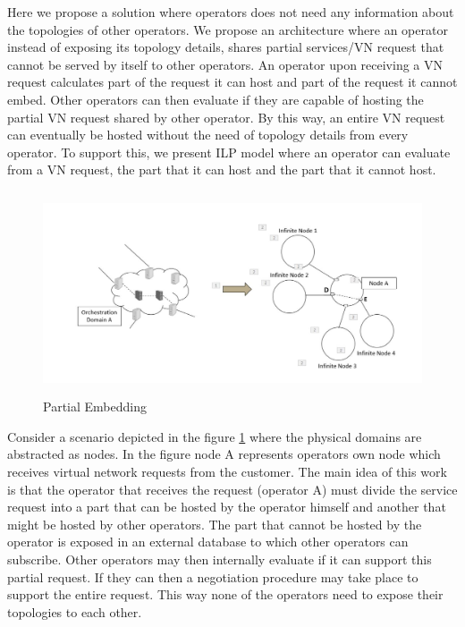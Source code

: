 \documentclass[article,dr=phil,type=msc ,colorback,accentcolor=tud4b]{tudthesis}
\begin{document}
Here we propose a solution where operators does not need any information about the topologies of other operators. We propose an architecture where an operator instead of exposing its topology details, shares partial services/VN request that cannot be served by itself to other operators. An operator upon receiving a VN request calculates part of the request it can host and part of the request it cannot embed. Other operators can then evaluate if they are capable of hosting the partial VN request shared by other operator. By this way, an entire VN request can eventually be hosted without the need of topology details from every operator. To support this, we present ILP model where an operator can evaluate from a VN request, the part that it can host and the part that it cannot host.
\begin{figure}[h]
	\centering
	\includegraphics[width=14cm, height=6cm]{Part_embed.jpg}
	\caption{Partial Embedding}
	\label{fig: Partial_Embedding}
\end{figure}
Consider a scenario depicted in the figure \ref{fig: Partial_Embedding} where the physical domains are abstracted as nodes. In the figure node A represents operators own node which receives virtual network requests from the customer. The main idea of this work is that the operator that receives the request (operator A) must  divide the service request into a part that can be hosted by the operator himself and another that might be hosted by other  operators. The part that cannot be hosted by the operator is exposed in an external database to which other operators can subscribe. Other operators may then internally evaluate if it can support this partial request. If they can then a negotiation procedure may take place to support the entire request. This way none of the operators need to expose their topologies to each other.\newline
\end{document}
